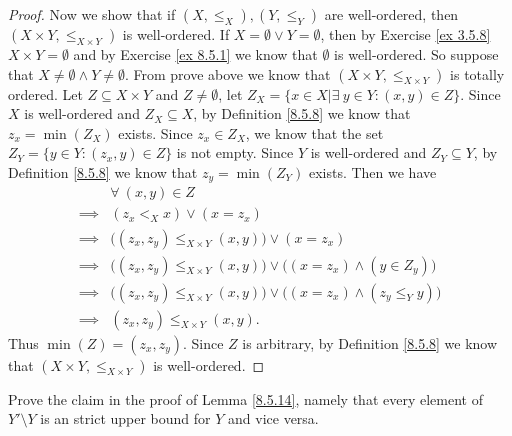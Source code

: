 \begin{proof}
    Now we show that if \((X, \leq_X), (Y, \leq_Y)\) are well-ordered, then \((X \times Y, \leq_{X \times Y})\) is well-ordered.
    If \(X = \emptyset \lor Y = \emptyset\), then by Exercise \ref{ex 3.5.8} \(X \times Y = \emptyset\) and by Exercise \ref{ex 8.5.1} we know that \(\emptyset\) is well-ordered.
    So suppose that \(X \neq \emptyset \land Y \neq \emptyset\).
    From prove above we know that \((X \times Y, \leq_{X \times Y})\) is totally ordered.
    Let \(Z \subseteq X \times Y\) and \(Z \neq \emptyset\), let \(Z_X = \{x \in X | \exists\ y \in Y : (x, y) \in Z\}\).
    Since \(X\) is well-ordered and \(Z_X \subseteq X\), by Definition \ref{8.5.8} we know that \(z_x = \min(Z_X)\) exists.
    Since \(z_x \in Z_X\), we know that the set \(Z_Y = \{y \in Y : (z_x, y) \in Z\}\) is not empty.
    Since \(Y\) is well-ordered and \(Z_Y \subseteq Y\), by Definition \ref{8.5.8} we know that \(z_y = \min(Z_Y)\) exists.
    Then we have
    \begin{align*}
                 & \forall\ (x, y) \in Z                                                                       \\
        \implies & (z_x <_X x) \lor (x = z_x)                                                                  \\
        \implies & \big((z_x, z_y) \leq_{X \times Y} (x, y)\big) \lor (x = z_x)                                \\
        \implies & \big((z_x, z_y) \leq_{X \times Y} (x, y)\big) \lor \big((x = z_x) \land (y \in Z_y)\big)    \\
        \implies & \big((z_x, z_y) \leq_{X \times Y} (x, y)\big) \lor \big((x = z_x) \land (z_y \leq_Y y)\big) \\
        \implies & (z_x, z_y) \leq_{X \times Y} (x, y).
    \end{align*}
    Thus \(\min(Z) = (z_x, z_y)\).
    Since \(Z\) is arbitrary, by Definition \ref{8.5.8} we know that \((X \times Y, \leq_{X \times Y})\) is well-ordered.
\end{proof}

\begin{exercise}\label{ex 8.5.13}
    Prove the claim in the proof of Lemma \ref{8.5.14}, namely that every element of \(Y' \setminus Y\) is an strict upper bound for \(Y\) and vice versa.
\end{exercise}

